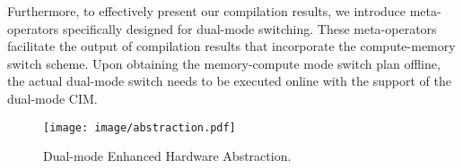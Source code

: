 Furthermore, to effectively present our compilation results, we introduce meta-operators specifically designed for dual-mode switching. These meta-operators facilitate the output of compilation results that incorporate the compute-memory switch scheme.
Upon obtaining the memory-compute mode switch plan offline, the actual dual-mode switch needs to be executed online with the support of the dual-mode CIM.

\begin{figure}[t]
    \centering
    \texttt{[image: image/abstraction.pdf]}
    \caption{Dual-mode Enhanced Hardware Abstraction.}
    \label{fig: abstraction}
\end{figure}
